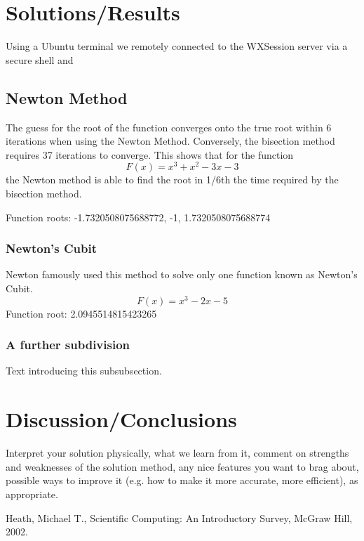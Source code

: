 \documentclass[11pt]{article}
\begin{document}
\section{Solutions/Results}\label{S:4}
Using a Ubuntu terminal we remotely connected to the WXSession server via a secure shell and 

\subsection{Newton Method}
%
The guess for the root of the function converges onto the true root within 6 iterations when using the Newton Method. Conversely, the bisection method requires 37 iterations to converge. This shows that for the function \[F(x)=x^3+x^2-3x-3\] the Newton method is able to find the root in 1/6th the time required by the bisection method.

Function roots: -1.7320508075688772, -1, 1.7320508075688774
\subsubsection{Newton's Cubit}
%
Newton famously used this method to solve only one function known as Newton's Cubit. \[F(x)=x^3-2x-5\]
Function root: 2.0945514815423265  

\subsubsection{A further subdivision}
%
Text introducing this subsubsection. 

\section{Discussion/Conclusions}\label{S:5}
Interpret your solution physically, what we learn from it, comment on strengths and weaknesses of the solution method, any nice features you want to brag about, possible ways to improve it (e.g. how to make it more accurate, more efficient), as appropriate.


\begin{thebibliography}{100}
Heath, Michael T., Scientific Computing: An Introductory Survey, McGraw Hill, 2002.
%
%

\end{thebibliography}
\end{document}
